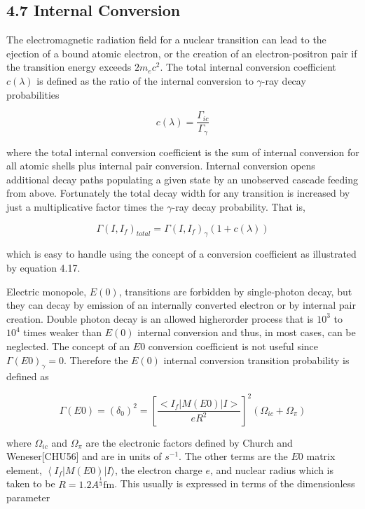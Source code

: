 \documentclass[10pt]{article}
\begin{document}
\subsection*{4.7 Internal Conversion}
The electromagnetic radiation field for a nuclear transition can lead to the ejection of a bound atomic electron, or the creation of an electron-positron pair if the transition energy exceeds $2 m_{e} c^{2}$. The total internal conversion coefficient $c(\lambda)$ is defined as the ratio of the internal conversion to $\gamma$-ray decay probabilities


\begin{equation*}
c(\lambda)=\frac{\Gamma_{i c}}{\Gamma_{\gamma}} \tag{4.52}
\end{equation*}


where the total internal conversion coefficient is the sum of internal conversion for all atomic shells plus internal pair conversion. Internal conversion opens additional decay paths populating a given state by an unobserved cascade feeding from above. Fortunately the total decay width for any transition is increased by just a multiplicative factor times the $\gamma$-ray decay probability. That is,


\begin{equation*}
\Gamma\left(I, I_{f}\right)_{t o t a l}=\Gamma\left(I, I_{f}\right)_{\gamma}(1+c(\lambda)) \tag{4.53}
\end{equation*}


which is easy to handle using the concept of a conversion coefficient as illustrated by equation 4.17.

Electric monopole, $E(0)$, transitions are forbidden by single-photon decay, but they can decay by emission of an internally converted electron or by internal pair creation. Double photon decay is an allowed higherorder process that is $10^{3}$ to $10^{4}$ times weaker than $E(0)$ internal conversion and thus, in most cases, can be neglected. The concept of an $E 0$ conversion coefficient is not useful since $\Gamma(E 0)_{\gamma}=0$. Therefore the $E(0)$ internal conversion transition probability is defined as


\begin{equation*}
\Gamma(E 0)=\left(\delta_{0}\right)^{2}=\left[\frac{<I_{f}|M(E 0)| I>}{e R^{2}}\right]^{2}\left(\Omega_{i c}+\Omega_{\pi}\right) \tag{4.54}
\end{equation*}


where $\Omega_{i c}$ and $\Omega_{\pi}$ are the electronic factors defined by Church and Weneser[CHU56] and are in units of $s^{-1}$. The other terms are the $E 0$ matrix element, $\left\langle I_{f}\right| M(E 0)|I\rangle$, the electron charge $e$, and nuclear radius which is taken to be $R=1.2 A^{\frac{1}{3}} \mathrm{fm}$. This usually is expressed in terms of the dimensionless parameter
\end{document}
